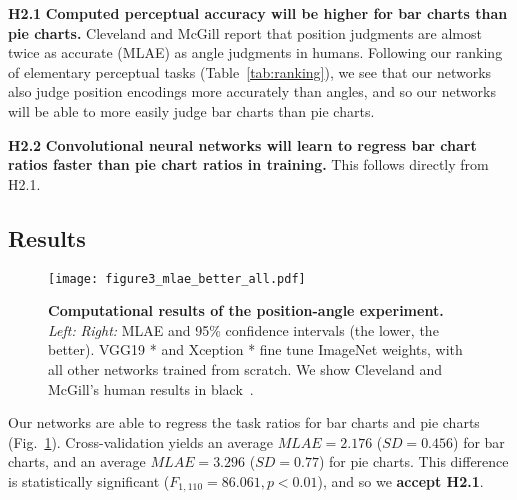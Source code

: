 \begin{hypolist}
	\item \textbf{H2.1} \textbf{Computed perceptual accuracy will be higher for bar charts than pie charts.} Cleveland and McGill report that position judgments are almost twice as accurate (MLAE) as angle judgments in humans. Following our ranking of elementary perceptual tasks (Table~\ref{tab:ranking}), we see that our networks also judge position encodings more accurately than angles, and so our networks will be able to more easily judge bar charts than pie charts.
	\item \textbf{H2.2} \textbf{Convolutional neural networks will learn to regress bar chart ratios faster than pie chart ratios in training.} This follows directly from H2.1.
\end{hypolist}

\subsection{Results}

\begin{figure}[tb]
	\centering
	  \texttt{[image: figure3\_mlae\_better\_all.pdf]}
  \caption{\textbf{Computational results of the position-angle experiment.} \textit{Left:}  \textit{Right:} MLAE and  95\% confidence intervals (the lower, the better). VGG19 * and Xception * fine tune ImageNet weights, with all other networks trained from scratch. We show Cleveland and McGill's human results in black~\cite{cleveland_mcgill}.} %
	\label{fig:figure3_mlae}
\end{figure}



  Our networks are able to regress the task ratios for bar charts and pie charts (Fig.~\ref{fig:figure3_mlae}).  Cross-validation yields an average $MLAE=2.176$ ($SD=0.456$) for bar charts, and an average $MLAE=3.296$ ($SD=0.77$) for pie charts. This difference is statistically significant ($F_{1,110}=86.061, p<0.01$), and so we \textbf{accept H2.1}. 

